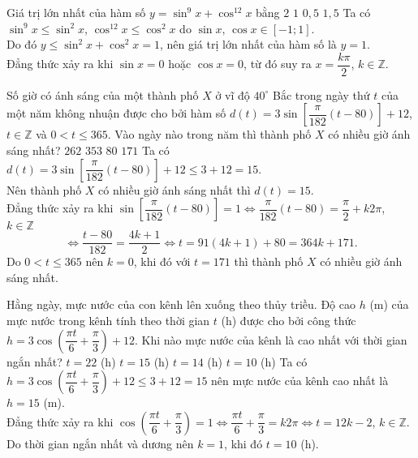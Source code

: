 \begin{bt}%
	Giá trị lớn nhất của hàm số $y=\sin^9 x+\cos^{12}x$ bằng
	\choice
	{$2$}
	{\True $1$}
	{$0{,}5$}
	{$1{,}5$}
	\loigiai
	{
		Ta có $\sin^9 x\le \sin^2 x$, $\cos^{12}x\le \cos^2x$ do $\sin x,\,\cos x\in[-1;1]$.\\
		Do đó $y\le \sin^2 x+\cos ^2x=1$, nên giá trị lớn nhất của hàm số là $y=1$.\\
		Đẳng thức xảy ra khi $\sin x=0$ hoặc $\cos x=0$, từ đó suy ra $x=\dfrac{k\pi}{2}$, $k\in\mathbb{Z}$.
	}
\end{bt}
\begin{bt}%
	Số giờ có ánh sáng của một thành phố $X$ ở vĩ độ $40^\circ$ Bắc trong ngày thứ $t$ của một năm không nhuận được cho bởi hàm số $d(t)=3\sin\left[\dfrac{\pi}{182}(t-80)\right]+12$, $t\in\mathbb{Z}$ và $0<t\le 365$. Vào ngày nào trong năm thì thành phố $X$ có nhiều giờ ánh sáng nhất?
	\choice
	{$262$}
	{$353$}
	{$80$}
	{\True $171$}
	\loigiai
	{
		Ta có $d(t)=3\sin\left[\dfrac{\pi}{182}(t-80)\right]+12\le 3+12=15$.\\
		Nên thành phố $X$ có nhiều giờ ánh sáng nhất thì $d(t)=15$.\\
		Đẳng thức xảy ra khi $\sin\left[\dfrac{\pi}{182}(t-80)\right]=1\Leftrightarrow \dfrac{\pi}{182}(t-80)=\dfrac{\pi}{2}+k2\pi$, $k\in\mathbb{Z}$
		\[\Leftrightarrow \dfrac{t-80}{182}=\dfrac{4k+1}{2}\Leftrightarrow t=91(4k+1)+80=364k+171.\]
		Do $0<t\le 365$ nên $k=0$, khi đó với $t=171$ thì thành phố $X$ có nhiều giờ ánh sáng nhất.
	}
\end{bt}
\begin{bt}%
	Hằng ngày, mực nước của con kênh lên xuống theo thủy triều. Độ cao $h$ (m) của mực nước trong kênh tính theo thời gian $t$ (h) được cho bởi công thức $h=3\cos\left(\dfrac{\pi t}{6}+\dfrac{\pi}{3}\right)+12$. Khi nào mực nước của kênh là cao nhất với thời gian ngắn nhất?
	\choice
	{$t=22$ (h)}
	{$t=15$ (h)}
	{$t=14$ (h)}
	{\True $t=10$ (h)}
	\loigiai
	{
		Ta có $h=3\cos\left(\dfrac{\pi t}{6}+\dfrac{\pi}{3}\right)+12\le 3+12=15$ nên mực nước của kênh cao nhất là $h=15$ (m).\\
		Đẳng thức xảy ra khi $\cos\left(\dfrac{\pi t}{6}+\dfrac{\pi}{3}\right)=1\Leftrightarrow \dfrac{\pi t}{6}+\dfrac{\pi}{3}=k2\pi\Leftrightarrow t=12k-2$, $k\in\mathbb{Z}$.\\
		Do thời gian ngắn nhất và dương nên $k=1$, khi đó $t=10$ (h).
	}
\end{bt}